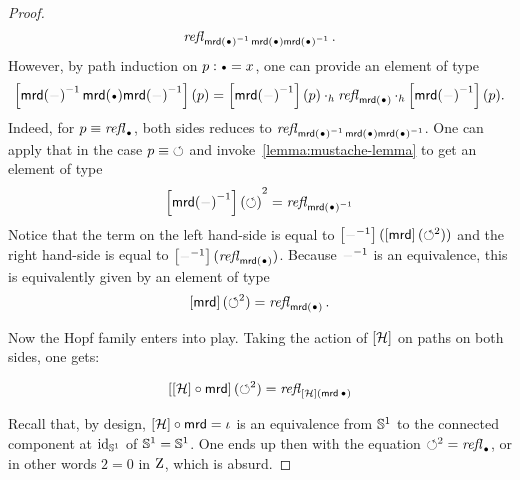 \documentclass[english,a4]{article}
\renewcommand{\ap}[1]{\left[{#1}\right]}
\begin{document}
\begin{proof}
\begin{displaymath}
    \refl{\inv{\mrd(\base)} \mrd(\base) \inv{\mrd(\base)}}.
  \end{displaymath}
  However, by path induction on $p\from \base = x$, one can provide an
  element of type
  \begin{displaymath}
    \ap{\inv{\mrd(\blank)} \mrd(\base) \inv{\mrd(\blank)}}(p) =
    \ap{\inv{\mrd(\blank)}}(p) \hcomp \refl{\mrd(\base)}
    \hcomp \ap{\inv{\mrd(\blank)}}(p). 
  \end{displaymath}
  Indeed, for $p\jdeq \refl{\base}$, both sides reduces to
  $\refl{\inv{\mrd(\base)} \mrd(\base) \inv{\mrd(\base)}}$. One can
  apply that in the case $p\equiv \mathord{\circlearrowleft}$ and
  invoke~\cref{lemma:mustache-lemma} to get an element of type
  \begin{displaymath}
    {\ap{\inv{\mrd(\blank)}}(\Sloop)}^2 = \refl{\inv{\mrd(\base)}}
  \end{displaymath}
  Notice that the term on the left hand-side is equal to
  $\ap{\inv{\blank}}(\ap\mrd (\Sloop^2))$ and the right hand-side is
  equal to $\ap{\inv{\blank}}(\refl{\mrd(\base)})$. Because
  $\inv{\blank}$ is an equivalence, this is equivalently given by an
  element of type
  \begin{displaymath}
    \ap\mrd(\Sloop^2) = \refl{\mrd(\base)}.
  \end{displaymath}

  Now the Hopf family enters into play. Taking the action of $\ap\hopf$ on
  paths on both sides, one gets:
  
  \begin{displaymath}
    \ap{\ap\hopf\circ \mrd}(\Sloop^2) = \refl{\ap\hopf(\mrd\base)}
  \end{displaymath}
  
  Recall that, by design, ${\ap\hopf}\circ{\mrd} = \iota$ is an equivalence
  from ${{\mathbb S^{1}}}$ to the connected component at $\mathord{\mathrm{id}}_{{\mathbb S^{1}}}$ of ${{\mathbb S^{1}}}={{\mathbb S^{1}}}$. One ends up
  then with the equation $\Sloop^2 = \refl \base$, or in other words $2=0$ in
  $\mathrm{Z}$, which is absurd.
  
\end{proof}
\end{document}
